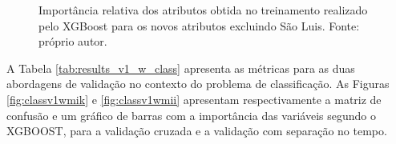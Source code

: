\begin{figure}[h]
\center
{}
\caption{Importância relativa dos atributos obtida no treinamento realizado pelo XGBoost para os novos atributos excluindo São Luis. Fonte: próprio autor.}\label{fig:regv1w}
\end{figure}

A Tabela \ref{tab:results_v1_w_class} apresenta as métricas para as duas abordagens de validação no contexto do problema de classificação. As Figuras \ref{fig:classv1wmik} e \ref{fig:classv1wmii} apresentam respectivamente a matriz de confusão e um gráfico de barras com a importância das variáveis segundo o XGBOOST, para a validação cruzada e a validação com separação no tempo.

